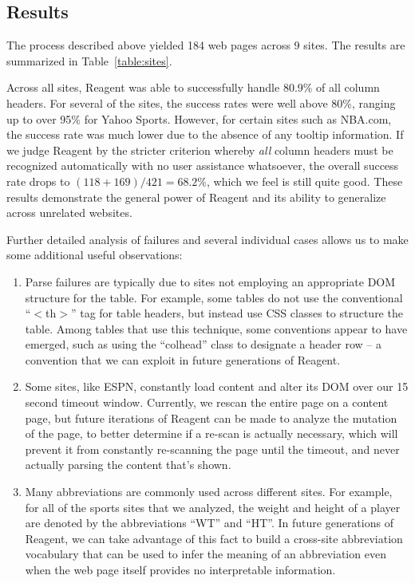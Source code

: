\subsection{Results}

The process described above yielded 184 web pages across 9 sites.
The results are summarized in  Table~\ref{table:sites}.

Across all sites, Reagent was able to successfully handle 80.9\% of all column headers. For several of the sites,
the success rates were well above 80\%, ranging up to over 95\% for Yahoo Sports.
However, for certain sites such as NBA.com, the success rate was much lower due to the absence of any
tooltip information. If we judge Reagent by the stricter criterion whereby {\em all} column headers must be
recognized automatically with no user assistance whatsoever, the overall success rate drops to
$(118 + 169) / 421 = 68.2\%$, which we feel is still quite good. These results demonstrate the general power of
Reagent and its ability to generalize across unrelated websites.

Further detailed analysis of failures and several individual cases allows us to make some additional useful observations:
\begin{enumerate}
    \item Parse failures are typically due to sites not employing an appropriate DOM structure for the table. For example, some tables do not use the conventional ``$<$th$>$'' tag for table headers, but instead use CSS classes to structure the table. Among tables that use this technique, some conventions appear to have emerged, such as using the ``colhead'' class to designate a header row -- a convention that we can exploit in future generations of Reagent.
    \item Some sites, like ESPN, constantly load content and alter its DOM over our 15 second timeout window. Currently, we rescan the entire page on a content page, but future iterations of Reagent can be made to analyze the mutation of the page, to better determine if a re-scan is actually necessary, which will prevent it from constantly re-scanning the page until the timeout, and never actually parsing the content that's shown.
    \item Many abbreviations are commonly used across different sites. For example, for all of the sports sites that we analyzed, the weight and height of a player are denoted by the abbreviations ``WT'' and ``HT''. In future generations of Reagent, we can take advantage of this fact to build a cross-site abbreviation vocabulary that can be used to infer the meaning of an abbreviation even when the web page itself provides no interpretable information.
\end{enumerate}